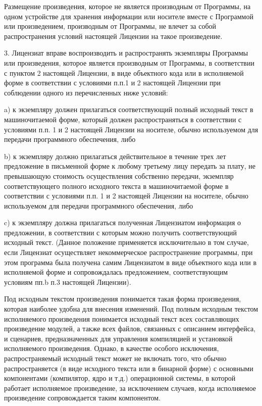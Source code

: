 \begin{small}
Размещение произведения, которое не является производным от Программы, на
одном устройстве для хранения информации или носителе вместе с Программой
или произведением, производным от Программы, не влечет за собой
распространения условий настоящей Лицензии на такое произведение.

3. Лицензиат вправе воспроизводить и распространять экземпляры Программы
или произведения, которое является производным от Программы, в
соответствии с пунктом 2 настоящей Лицензии, в виде объектного кода или
в исполняемой форме в соответствии с условиями п.п.1 и 2 настоящей
Лицензии при соблюдении одного из перечисленных ниже условий:

    a) к экземпляру должен прилагаться соответствующий полный исходный
текст в машиночитаемой форме, который должен распространяться в
соответствии с условиями п.п. 1 и 2 настоящей Лицензии на носителе,
обычно используемом для передачи программного обеспечения, либо

    b) к экземпляру должно прилагаться действительное в течение трех лет
предложение в письменной форме к любому третьему лицу передать за плату,
не превышающую стоимость осуществления собственно передачи, экземпляр
соответствующего полного исходного текста в машиночитаемой форме в
соответствии с условиями п.п. 1 и 2 настоящей Лицензии на носителе, обычно
используемом для передачи программного обеспечения, либо

    c) к экземпляру должна прилагаться полученная Лицензиатом информация
о предложении, в соответствии с которым можно получить соответствующий
исходный текст. (Данное положение применяется исключительно в том случае,
если Лицензиат осуществляет некоммерческое распространение программы, при
этом программа была получена самим Лицензиатом в виде объектного кода или
в исполняемой форме и сопровождалась предложением, соответствующим
условиям пп.b п.3 настоящей Лицензии).

Под исходным текстом произведения понимается такая форма произведения,
которая наиболее удобна для внесения изменений. Под полным исходным
текстом исполняемого произведения понимается исходный текст всех
составляющих произведение модулей, а также всех файлов, связанных с
описанием интерфейса, и сценариев, предназначенных для управления
компиляцией и установкой исполняемого произведения. Однако, в качестве
особого исключения, распространяемый исходный текст может не включать
того, что обычно распространяется (в виде исходного текста или в
бинарной форме) с основными компонентами (компилятор, ядро и т.д.)
операционной системы, в которой работает исполняемое произведение, за
исключением случаев, когда исполняемое произведение сопровождается таким
компонентом.


\end{small}
